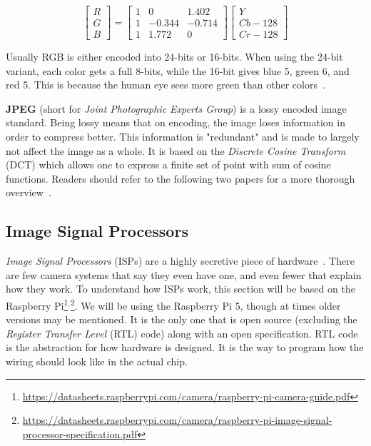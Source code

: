 \[
\begin{bmatrix}
R \\
G \\
B
\end{bmatrix}
=
\begin{bmatrix}
1 & 0 & 1.402 \\
1 & -0.344 & -0.714 \\
1 & 1.772 & 0
\end{bmatrix}
\begin{bmatrix}
Y \\
Cb - 128 \\
Cr - 128
\end{bmatrix}
\]

Usually RGB is either encoded into 24-bits or 16-bits. When using the 24-bit
variant, each color gets a full 8-bits, while the 16-bit gives blue 5, green 6,
and red 5. This is because the human eye sees more green than other colors~\cite{davson2010human}.

\textbf{JPEG} (short for \textit{Joint Photographic Experts Group}) is a lossy
encoded image standard. Being lossy means that on encoding, the image loses
information in order to compress better. This information is "redundant" and is
made to largely not affect the image as a whole. It is based on the
\textit{Discrete Cosine Transform} (DCT) which allows one to express a finite
set of point with sum of cosine functions. Readers should refer to the
following two papers for a more thorough overview~\cite{wallace1991jpeg,
itu1993digital}.

\subsection{Image Signal Processors} \label{section:isp}
\textit{Image Signal Processors} (ISPs) are a highly secretive piece of
hardware~\cite{adams2010frankencamera}. There are few camera systems that say
they even have one, and even fewer that explain how they work. To understand
how ISPs work, this section will be based on the Raspberry Pi\footnote{\url{https://datasheets.raspberrypi.com/camera/raspberry-pi-camera-guide.pdf}}$^,$\footnote{\url{https://datasheets.raspberrypi.com/camera/raspberry-pi-image-signal-processor-specification.pdf}}.
We will be using the Raspberry Pi 5, though at times older versions may be
mentioned. It is the only one that is open source (excluding the \textit{Register Transfer
Level} (RTL) code) along with an open specification. RTL code is the
abstraction for how hardware is designed. It is the way to program how the
wiring should look like in the actual chip.

